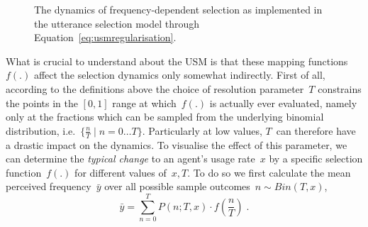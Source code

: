 \begin{figure}[htbp]

{\centering {}

}

\caption{The dynamics of frequency-dependent selection as implemented in the utterance selection model through Equation~\ref{eq:usmregularisation}.}\label{fig:usmregularisation}
\end{figure}



What is crucial to understand about the USM is that these mapping functions~$f(.)$ affect the selection dynamics only somewhat indirectly. First of all, according to the definitions above the choice of resolution parameter~$T$ constrains the points in the $[0,1]$ range at which~$f(.)$ is actually ever evaluated, namely only at the fractions which can be sampled from the underlying binomial distribution, i.e.~$\{\frac{n}{T}\;|\;n=0\dots T\}$.
Particularly at low values, $T$~can therefore have a drastic impact on the dynamics. To visualise the effect of this parameter, we can determine the \emph{typical change} to an agent's usage rate~$x$ by a specific selection function~$f(.)$ for different values of~$x, T$. To do so we first calculate the mean perceived frequency~$\bar{y}$ over all possible sample outcomes~$n\sim Bin(T,x)$,
\begin{equation}\label{eq:meanperceivedfrequency}
\bar{y} = \sum_{n=0}^T P(n;T,x)\cdot f(\frac{n}{T})\;.
\end{equation}

